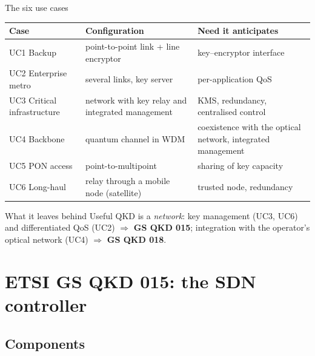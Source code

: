 \documentclass[10pt]{beamer}
\begin{document}
\begin{frame}{The six use cases}
  \scriptsize
  \begin{tabularx}{\textwidth}{@{}l L L@{}}
    \toprule
    \textbf{Case} & \textbf{Configuration} & \textbf{Need it anticipates} \\
    \midrule
    UC1 Backup & point-to-point link + line encryptor & key–encryptor interface \\
    UC2 Enterprise metro & several links, key server & per-application QoS \\
    UC3 Critical infrastructure & network with key relay and integrated management & KMS, redundancy, centralised control \\
    UC4 Backbone & quantum channel in WDM & coexistence with the optical network, integrated management \\
    UC5 PON access & point-to-multipoint & sharing of key capacity \\
    UC6 Long-haul & relay through a mobile node (satellite) & trusted node, redundancy \\
    \bottomrule
  \end{tabularx}
  \vspace{1ex}
  \footnotesize
  \begin{exampleblock}{What it leaves behind}
    Useful QKD is a \emph{network}: key management (UC3, UC6) and
    differentiated QoS (UC2) $\Rightarrow$ \textbf{GS QKD 015}; integration
    with the operator's optical network (UC4) $\Rightarrow$ \textbf{GS QKD 018}.
  \end{exampleblock}
\end{frame}

\section[GS QKD 015]{ETSI GS QKD 015: the SDN controller}

\subsection{Components}
\end{document}
